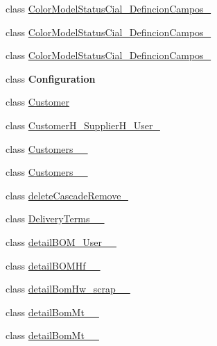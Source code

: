 \begin{DoxyCompactItemize}
\item 
class \mbox{\hyperlink{class_h_k_supply_1_1_migrations_1_1_color_model_status_cial___defincion_campos__22}{Color\+Model\+Status\+Cial\+\_\+\+Defincion\+Campos\+\_}}
\item 
class \mbox{\hyperlink{class_h_k_supply_1_1_migrations_1_1_color_model_status_cial___defincion_campos__23}{Color\+Model\+Status\+Cial\+\_\+\+Defincion\+Campos\+\_}}
\item 
class \mbox{\hyperlink{class_h_k_supply_1_1_migrations_1_1_color_model_status_cial___defincion_campos__24}{Color\+Model\+Status\+Cial\+\_\+\+Defincion\+Campos\+\_}}
\item 
class {\bfseries Configuration}
\item 
class \mbox{\hyperlink{class_h_k_supply_1_1_migrations_1_1_customer}{Customer}}
\item 
class \mbox{\hyperlink{class_h_k_supply_1_1_migrations_1_1_customer_h___supplier_h___user__01}{Customer\+H\+\_\+\+Supplier\+H\+\_\+\+User\+\_}}
\item 
class \mbox{\hyperlink{class_h_k_supply_1_1_migrations_1_1_customers__12042017__1}{Customers\+\_\+\_}}
\item 
class \mbox{\hyperlink{class_h_k_supply_1_1_migrations_1_1_customers__12042017__2}{Customers\+\_\+\_}}
\item 
class \mbox{\hyperlink{class_h_k_supply_1_1_migrations_1_1delete_cascade_remove__01}{delete\+Cascade\+Remove\+\_}}
\item 
class \mbox{\hyperlink{class_h_k_supply_1_1_migrations_1_1_delivery_terms__20170725__01}{Delivery\+Terms\+\_\+\_}}
\item 
class \mbox{\hyperlink{class_h_k_supply_1_1_migrations_1_1detail_b_o_m___user__20170606__01}{detail\+B\+O\+M\+\_\+\+User\+\_\+\_}}
\item 
class \mbox{\hyperlink{class_h_k_supply_1_1_migrations_1_1detail_b_o_m_hf__20170606__01}{detail\+B\+O\+M\+Hf\+\_\+\_}}
\item 
class \mbox{\hyperlink{class_h_k_supply_1_1_migrations_1_1detail_bom_hw__scrap__20170530__01}{detail\+Bom\+Hw\+\_\+scrap\+\_\+\_}}
\item 
class \mbox{\hyperlink{class_h_k_supply_1_1_migrations_1_1detail_bom_mt__20170526__01}{detail\+Bom\+Mt\+\_\+\_}}
\item 
class \mbox{\hyperlink{class_h_k_supply_1_1_migrations_1_1detail_bom_mt__20170526__02}{detail\+Bom\+Mt\+\_\+\_}}

\end{DoxyCompactItemize}
